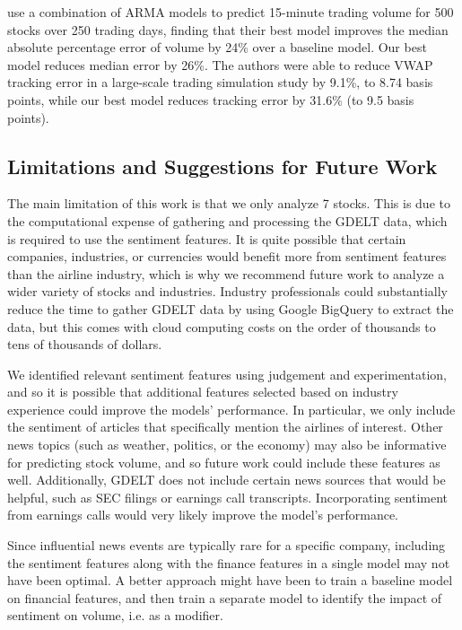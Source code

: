 \documentclass[12pt]{article}
\begin{document}
\textcite{satish2014predicting} use a combination of ARMA models to predict 15-minute trading volume for 500 stocks over 250 trading days, finding that their best model improves the median absolute percentage error of volume by 24\% over a baseline model. Our best model reduces median error by 26\%. The authors were able to reduce VWAP tracking error in a large-scale trading simulation study by 9.1\%, to 8.74 basis points, while our best model reduces tracking error by 31.6\% (to 9.5 basis points).

\subsection{Limitations and Suggestions for Future Work}
The main limitation of this work is that we only analyze 7 stocks. This is due to the computational expense of gathering and processing the GDELT data, which is required to use the sentiment features. It is quite possible that certain companies, industries, or currencies would benefit more from sentiment features than the airline industry, which is why we recommend future work to analyze a wider variety of stocks and industries. Industry professionals could substantially reduce the time to gather GDELT data by using Google BigQuery to extract the data, but this comes with cloud computing costs on the order of thousands to tens of thousands of dollars.

We identified relevant sentiment features using judgement and experimentation, and so it is possible that additional features selected based on industry experience could improve the models' performance. In particular, we only include the sentiment of articles that specifically mention the airlines of interest. Other news topics (such as weather, politics, or the economy) may also be informative for predicting stock volume, and so future work could include these features as well. Additionally, GDELT does not include certain news sources that would be helpful, such as SEC filings or earnings call transcripts. Incorporating sentiment from earnings calls would very likely improve the model's performance.

Since influential news events are typically rare for a specific company, including the sentiment features along with the finance features in a single model may not have been optimal. A better approach might have been to train a baseline model on financial features, and then train a separate model to identify the impact of sentiment on volume, i.e. as a modifier.
\end{document}
